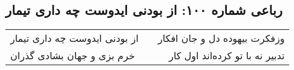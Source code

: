 \begin{center}
\section*{رباعی شماره ۱۰۰: از بودنی ایدوست چه داری تیمار}
\label{sec:sh100}
\begin{longtable}{l p{0.5cm} r}
از بودنی ایدوست چه داری تیمار
&&
وزفکرت بیهوده دل و جان افکار
\\
خرم بزی و جهان بشادی گذران
&&
تدبیر نه با تو کرده‌اند اول کار
\\
\end{longtable}
\end{center}
